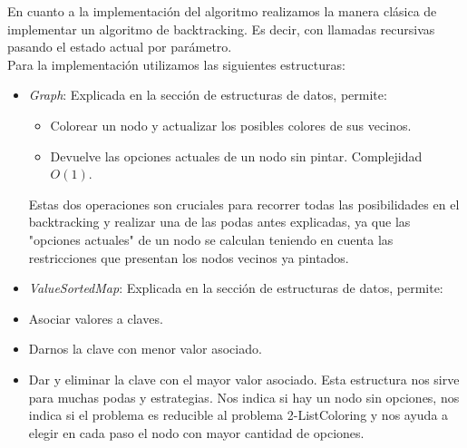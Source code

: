 En cuanto a la implementación del algoritmo realizamos la manera clásica de implementar un algoritmo de backtracking. Es decir, con llamadas recursivas pasando el estado actual por parámetro. \\
Para la implementación utilizamos las siguientes estructuras:
\begin{itemize}
\item \textit{Graph}: Explicada en la sección de estructuras de datos, permite:
	\begin{itemize}
	\item Colorear un nodo y actualizar los posibles colores de sus vecinos.
	\item Devuelve las opciones actuales de un nodo sin pintar. Complejidad $O(1)$. 
	\end{itemize}
Estas dos operaciones son cruciales para recorrer todas las posibilidades en el backtracking y realizar una de las podas antes explicadas, ya que las "opciones actuales" de un nodo se calculan teniendo en cuenta las restricciones que presentan los nodos vecinos ya pintados.
\item \textit{ValueSortedMap}: Explicada en la sección de estructuras de datos, permite:
	\item Asociar valores a claves.
	\item Darnos la clave con menor valor asociado. 
	\item Dar y eliminar la clave con el mayor valor asociado.
Esta estructura nos sirve para muchas podas y estrategias. Nos indica si hay un nodo sin opciones, nos indica si el problema es reducible al problema 2-ListColoring y nos ayuda a elegir en cada paso el nodo con mayor cantidad de opciones.
\end{itemize}

